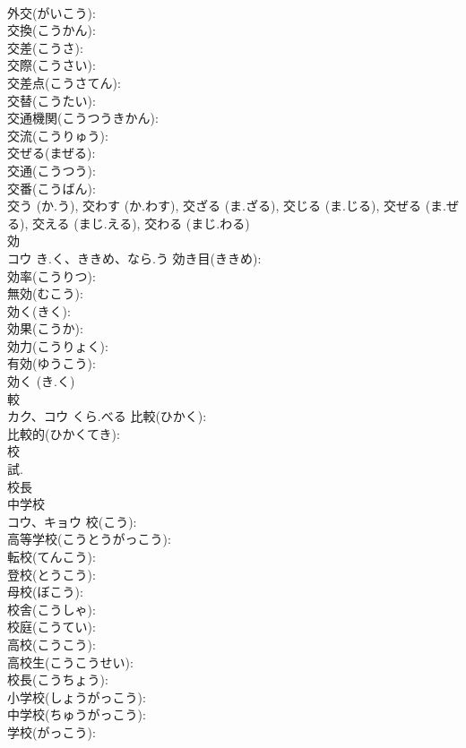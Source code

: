 \documentclass[8pt]{extreport}
\begin{document}
\begin{CJK}{UTF8}{min}
\\	外交(がいこう): 
\\	交換(こうかん): 
\\	交差(こうさ): 
\\	交際(こうさい): 
\\	交差点(こうさてん): 
\\	交替(こうたい): 
\\	交通機関(こうつうきかん): 
\\	交流(こうりゅう): 
\\	交ぜる(まぜる): 
\\	交通(こうつう): 
\\	交番(こうばん): 
\\	交う (か.う), 交わす (か.わす), 交ざる (ま.ざる), 交じる (ま.じる), 交ぜる (ま.ぜる), 交える (まじ.える), 交わる (まじ.わる)
\\	効			
\\	コウ	き.く、ききめ、なら.う	効き目(ききめ): 
\\	効率(こうりつ): 
\\	無効(むこう): 
\\	効く(きく): 
\\	効果(こうか): 
\\	効力(こうりょく): 
\\	有効(ゆうこう): 
\\	効く (き.く)
\\	較			
\\	カク、コウ	くら.べる	比較(ひかく): 
\\	比較的(ひかくてき): 
\\	校			
\\	試.	
\\	校長 
\\	中学校 
\\	コウ、キョウ		校(こう): 
\\	高等学校(こうとうがっこう): 
\\	転校(てんこう): 
\\	登校(とうこう): 
\\	母校(ぼこう): 
\\	校舎(こうしゃ): 
\\	校庭(こうてい): 
\\	高校(こうこう): 
\\	高校生(こうこうせい): 
\\	校長(こうちょう): 
\\	小学校(しょうがっこう): 
\\	中学校(ちゅうがっこう): 
\\	学校(がっこう): 

\end{CJK}
\end{document}
